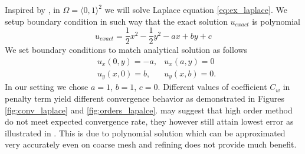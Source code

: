 \begin{example}[Diffusion 2D]
\label{ex:laplace}
Inspired by \cite[cv. 8.4 (3), p. 150]{Holubova2011}, in $\Omega = \langle 0, 1 
\rangle^2$ 
we will solve Laplace equation \eqref{eq:ex_laplace}.
We setup boundary condition in such way that the exact solution 
$u_{exact}$ is polynomial
\begin{equation}
u_{exact} = \frac{1}{2}x^2 - \frac{1}{2}y^2 - ax + by + c
\end{equation}
We set boundary conditions to match analytical solution as follows
\begin{equation}
	\begin{aligned}
		&u_x(0, y) = -a, & u_x(a, y) = 0\\
		&u_y(x, 0) = b, & u_y(x, b) = 0.
	\end{aligned}
\end{equation}
In our setting we chose $a=1$, $b=1$, $c=0$. Different values of 
coefficient $C_w$ in penalty term yield different convergence behavior as demonstrated in 
Figures \ref{fig:conv_laplace} and \ref{fig:orders_lapalce}.   
may suggest that high order method do not meet expected convergence rate, they however 
still attain lowest error as illustrated in . This is due to 
polynomial solution which can be approximated very accurately even on coarse mesh and 
refining does not provide much benefit.
\end{example}

